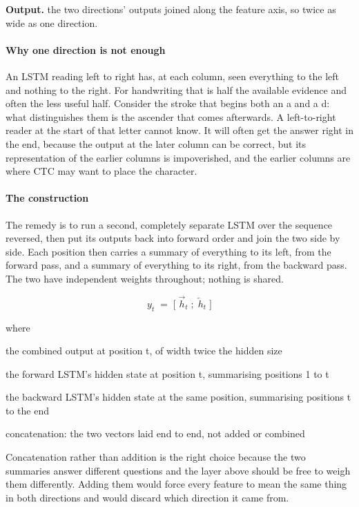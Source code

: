 \noindent\textbf{Output.} the two directions' outputs joined along the feature axis, so twice as wide as one direction.


\paragraph{Why one direction is not enough}
An LSTM reading left to right has, at each column, seen everything to the left and nothing to the right. For handwriting that is half the available evidence and often the less useful half. Consider the stroke that begins both an a and a d: what distinguishes them is the ascender that comes afterwards. A left-to-right reader at the start of that letter cannot know. It will often get the answer right in the end, because the output at the later column can be correct, but its representation of the earlier columns is impoverished, and the earlier columns are where CTC may want to place the character.


\paragraph{The construction}
The remedy is to run a second, completely separate LSTM over the sequence reversed, then put its outputs back into forward order and join the two side by side. Each position then carries a summary of everything to its left, from the forward pass, and a summary of everything to its right, from the backward pass. The two have independent weights throughout; nothing is shared.


\begin{equation}
y_t \;=\; \big[\; \overrightarrow{h}_t \;;\; \overleftarrow{h}_t \;\big]
\end{equation}

\noindent where
\begin{description}[leftmargin=2.4em,style=nextline,font=\normalfont\ttfamily]\setlength\itemsep{1pt}
  \item[{$y_t$}] \normalfont the combined output at position t, of width twice the hidden size
  \item[{$\overrightarrow{h}_t$}] \normalfont the forward LSTM's hidden state at position t, summarising positions 1 to t
  \item[{$\overleftarrow{h}_t$}] \normalfont the backward LSTM's hidden state at the same position, summarising positions t to the end
  \item[{$[\;\cdot\;;\;\cdot\;]$}] \normalfont concatenation: the two vectors laid end to end, not added or combined
\end{description}
Concatenation rather than addition is the right choice because the two summaries answer different questions and the layer above should be free to weigh them differently. Adding them would force every feature to mean the same thing in both directions and would discard which direction it came from.


